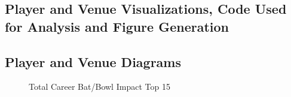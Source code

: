 \documentclass{article}[12pt]
\begin{document}
\begin{appendices}
\section{Player and Venue Visualizations, Code Used for Analysis and Figure Generation}
\label{appendix:vis}




\subsection{Player and Venue Diagrams}
\label{appendix:vis2}
\begin{figure}[!htb]
    \centering
    \qquad
    \caption{Total Career Bat/Bowl Impact Top 15}%
    \label{fig:career}%
\end{figure}


\end{appendices}
\end{document}
